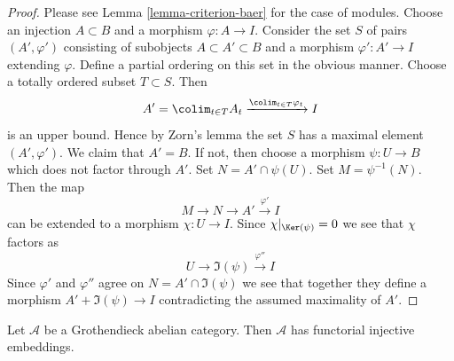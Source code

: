 \begin{proof}
Please see Lemma \ref{lemma-criterion-baer} for the case of modules.
Choose an injection $A \subset B$ and a morphism $\varphi : A \to I$.
Consider the set $S$ of pairs $(A', \varphi')$ consisting of
subobjects $A \subset A' \subset B$ and a morphism $\varphi' : A' \to I$
extending $\varphi$. Define a partial ordering on this set in the obvious
manner. Choose a totally ordered subset $T \subset S$. Then
$$
A' = \colim_{t \in T} A_t \xrightarrow{\colim_{t \in T} \varphi_t} I
$$
is an upper bound. Hence by Zorn's lemma the set $S$ has a maximal element
$(A', \varphi')$. We claim that $A' = B$. If not, then choose a morphism
$\psi : U \to B$ which does not factor through $A'$. Set
$N = A' \cap \psi(U)$. Set $M = \psi^{-1}(N)$. Then the map
$$
M \to N \to A' \xrightarrow{\varphi'} I
$$
can be extended to a morphism $\chi : U \to I$. Since
$\chi|_{\Ker(\psi)} = 0$ we see that $\chi$ factors as
$$
U \to \Im(\psi) \xrightarrow{\varphi''} I
$$
Since $\varphi'$ and $\varphi''$ agree on $N = A' \cap \Im(\psi)$
we see that together they define a morphism $A' + \Im(\psi) \to I$
contradicting the assumed maximality of $A'$.
\end{proof}

\begin{theorem}
\label{theorem-injective-embedding-grothendieck}
Let $\mathcal{A}$ be a Grothendieck abelian category.
Then $\mathcal{A}$ has functorial injective embeddings.
\end{theorem}

